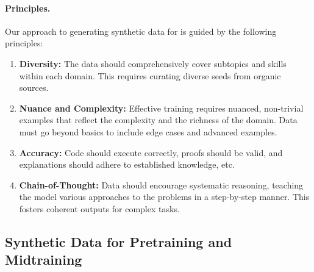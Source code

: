 \paragraph{Principles.} Our approach to generating synthetic data for \model is guided by the following principles:
\begin{enumerate}
    \item \textbf{Diversity:} The data should comprehensively cover subtopics and skills within each domain. This requires curating diverse seeds from organic sources.
    \item \textbf{Nuance and Complexity:} Effective training requires nuanced, non-trivial examples that reflect the complexity and the richness of the domain. Data must go beyond basics to include edge cases and advanced examples.
    \item \textbf{Accuracy:} Code should execute correctly, proofs should be valid, and explanations should adhere to established knowledge, etc.
    \item \textbf{Chain-of-Thought:} Data should encourage systematic reasoning, teaching the model various approaches to the problems in a step-by-step manner. This fosters coherent outputs for complex tasks.
\end{enumerate}

\subsection{Synthetic Data for Pretraining and Midtraining}

